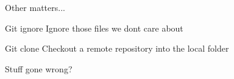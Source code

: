 \begin{frame}{Other matters...}
    \begin{block}{Git ignore}
        Ignore those files we dont care about
    \end{block}
    \begin{block}{Git clone}
        Checkout a remote repository into the local folder
    \end{block}
    \begin{block}{Stuff gone wrong?}
        
    \end{block}
\end{frame}
